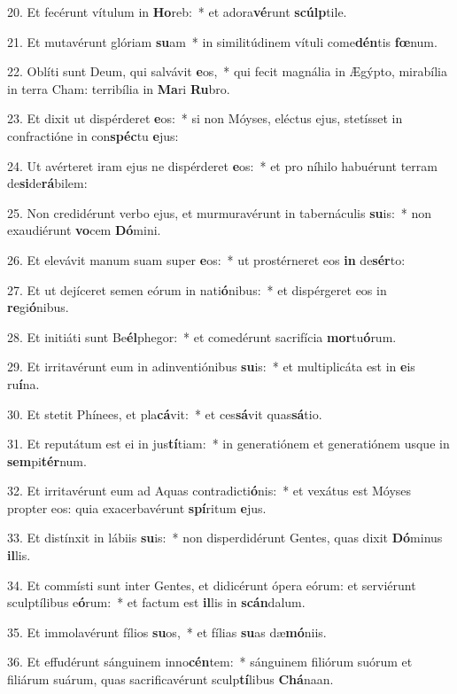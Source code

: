 20. Et fecérunt vítulum in \textbf{Ho}reb:~*  et adora\textbf{vé}runt \textbf{scúlp}tile.\

21. Et mutavérunt glóriam \textbf{su}am~*  in similitúdinem vítuli come\textbf{dén}tis \textbf{fœ}num.\

22. Oblíti sunt Deum, qui salvávit \textbf{e}os,~*  qui fecit magnália in Ægýpto, mirabília in terra Cham: terribília in \textbf{Ma}ri \textbf{Ru}bro.\

23. Et dixit ut dispérderet \textbf{e}os:~*  si non Móyses, eléctus ejus, stetísset in confractióne in con\textbf{spéc}tu \textbf{e}jus:\

24. Ut avérteret iram ejus ne dispérderet \textbf{e}os:~*  et pro níhilo habuérunt terram de\textbf{si}de\textbf{rá}bilem:\

25. Non credidérunt verbo ejus, et murmuravérunt in tabernáculis \textbf{su}is:~*  non exaudiérunt \textbf{vo}cem \textbf{Dó}mini.\

26. Et elevávit manum suam super \textbf{e}os:~*  ut prostérneret eos \textbf{in} de\textbf{sér}to:\

27. Et ut dejíceret semen eórum in nati\textbf{ó}nibus:~*  et dispérgeret eos in \textbf{re}gi\textbf{ó}nibus.\

28. Et initiáti sunt Be\textbf{él}phegor:~*  et comedérunt sacrifícia \textbf{mor}tu\textbf{ó}rum.\

29. Et irritavérunt eum in adinventiónibus \textbf{su}is:~*  et multiplicáta est in \textbf{e}is ru\textbf{í}na.\

30. Et stetit Phínees, et pla\textbf{cá}vit:~*  et ces\textbf{sá}vit quas\textbf{sá}tio.\

31. Et reputátum est ei in jus\textbf{tí}tiam:~*  in generatiónem et generatiónem usque in \textbf{sem}pi\textbf{tér}num.\

32. Et irritavérunt eum ad Aquas contradicti\textbf{ó}nis:~*  et vexátus est Móyses propter eos: quia exacerbavérunt \textbf{spí}ritum \textbf{e}jus.\

33. Et distínxit in lábiis \textbf{su}is:~*  non disperdidérunt Gentes, quas dixit \textbf{Dó}minus \textbf{il}lis.\

34. Et commísti sunt inter Gentes, et didicérunt ópera eórum: et serviérunt sculptílibus e\textbf{ó}rum:~*  et factum est \textbf{il}lis in \textbf{scán}dalum.\

35. Et immolavérunt fílios \textbf{su}os,~*  et fílias \textbf{su}as dæ\textbf{mó}niis.\

36. Et effudérunt sánguinem inno\textbf{cén}tem:~*  sánguinem filiórum suórum et filiárum suárum, quas sacrificavérunt sculp\textbf{tí}libus \textbf{Chá}naan.\

